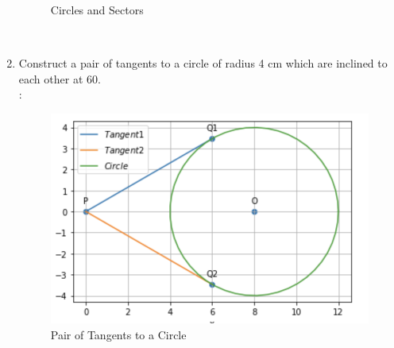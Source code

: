 \documentclass[journal,12pt,twocolumn]{IEEEtran}
\renewcommand\thesection{\arabic{section}}
\begin{document}
\begin{enumerate}[label=\thesection.\arabic*.,ref=\thesection.\theenumi]
\begin{figure}
	  \caption{Circles and Sectors}
	  \label{fig:geometry-3.9.pdf}
 \end{figure}\\ 
\item Construct a pair of tangents to a circle of radius 4 cm which are inclined to each other at 60\textdegree. \\
\solution: 
\begin{table}[ht]
 \centering
 \caption{}
 \end{table} 
 \begin{figure}
	  \centering 
	  \includegraphics[width=\columnwidth]{tans}
	  \caption{Pair of Tangents to a Circle}
	  \label{fig:geometry-3.9.pdf}
 \end{figure}\\ 
 


\end{enumerate}
\end{document}

